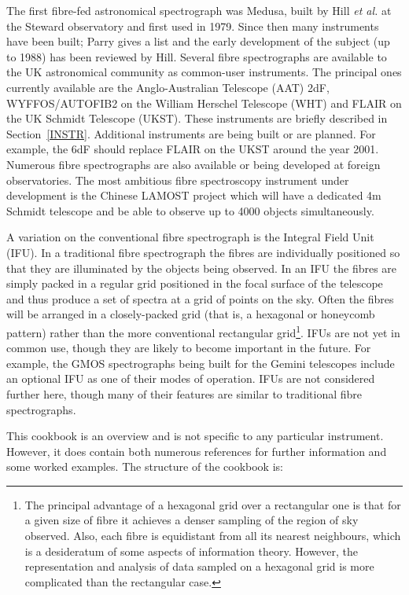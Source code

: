 \documentclass[twoside,11pt]{starlink}
\begin{document}
The first fibre-fed astronomical spectrograph was Medusa, built by
Hill \textit{et al.}\/\cite{HILL80} at the Steward observatory and first
used in 1979.  Since then many instruments have been built;
Parry\cite{PARRY97} gives a list and the early development of the
subject (up to 1988) has been reviewed by Hill\cite{HILL88}.  Several
fibre spectrographs are available to the UK astronomical community
as common-user instruments.  The principal ones currently available are
the Anglo-Australian Telescope (AAT) 2dF, WYFFOS/AUTOFIB2 on the William
Herschel Telescope (WHT) and FLAIR on the UK Schmidt Telescope (UKST).
These instruments are briefly described in Section~\ref{INSTR}.
Additional instruments are being built or are planned.  For example, the
6dF\cite{PARKER98} should replace FLAIR on the UKST around the year
2001.  Numerous fibre spectrographs are also available or being
developed at foreign observatories.  The most ambitious fibre
spectroscopy instrument under development is the Chinese LAMOST
project\cite{CHU97} which will have a dedicated 4m Schmidt
telescope and be able to observe up to 4000 objects simultaneously.

A variation on the conventional fibre spectrograph is the Integral
Field Unit (IFU).  In a traditional fibre spectrograph the fibres
are individually positioned so that they are illuminated by the
objects being observed.  In an IFU the fibres are simply packed in a
regular grid positioned in the focal surface of the telescope and thus
produce a set of spectra at a grid of points on the sky.  Often the
fibres will be arranged in a closely-packed grid (that is, a hexagonal
or honeycomb pattern) rather than the more conventional rectangular
grid\footnote{The principal advantage of a hexagonal grid over a
rectangular one is that for a given size of fibre it achieves a
denser sampling of the region of sky observed.  Also, each fibre is
equidistant from all its nearest neighbours, which is a desideratum of
some aspects of information theory.  However, the representation and
analysis of data sampled on a hexagonal grid is more complicated than
the rectangular case.}.  IFUs are not yet in common use, though they
are likely to become important in the future.  For example, the
GMOS spectrographs\cite{ALLINGTON97} being built for the Gemini
telescopes include an optional IFU as one of their modes of operation.
IFUs are not considered further here, though many of their features
are similar to traditional fibre spectrographs.

This cookbook is an overview and is not specific to any particular
instrument.  However, it does contain both numerous references for
further information and some worked examples.  The structure of the
cookbook is:
\end{document}

